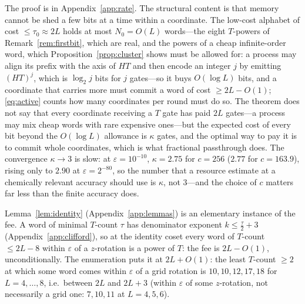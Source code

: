 \documentclass[aps,prx,twocolumn,superscriptaddress,nofootinbib,longbibliography]{revtex4-2}
\theoremstyle{plain}
\theoremstyle{definition}
\theoremstyle{remark}
\begin{document}
The proof is in Appendix~\ref{app:rate}. The structural content is that memory cannot be shed a few bits at a time within a coordinate. The low-cost alphabet of cost $\le\tau_0\approx2L$ holds at most $N_0=O(L)$ words---the eight $T$-powers of Remark~\ref{rem:firstbit}, which are real, and the powers of a cheap infinite-order word, which Proposition~\ref{prop:cluster} shows must be allowed for: a process may align its prefix with the axis of $HT$ and then encode an integer $j$ by emitting $(HT)^j$, which is $\log_2j$ bits for $j$ gates---so it buys $O(\log L)$ bits, and a coordinate that carries more must commit a word of cost $\ge2L-O(1)$; \eqref{eq:active} counts how many coordinates per round must do so. The theorem does not say that every coordinate receiving a $T$ gate has paid $2L$ gates---a process may mix cheap words with rare expensive ones---but the expected cost of every bit beyond the $O(\log L)$ allowance is $\kappa$ gates, and the optimal way to pay it is to commit whole coordinates, which is what fractional passthrough does. The convergence $\kappa\to3$ is slow: at $\varepsilon=10^{-10}$, $\kappa=2.75$ for $c=256$ ($2.77$ for $c=163.9$), rising only to $2.90$ at $\varepsilon=2^{-80}$, so the number that a resource estimate at a chemically relevant accuracy should use is $\kappa$, not $3$---and the choice of $c$ matters far less than the finite accuracy does.

Lemma~\ref{lem:identity} (Appendix~\ref{app:lemmas}) is an elementary instance of the fee. A word of minimal $T$-count $\tau$ has denominator exponent $k\le\tfrac\tau2+3$ (Appendix~\ref{app:clifford}), so at the identity coset every word of $T$-count $\le2L-8$ within $\varepsilon$ of a $z$-rotation is a power of $T$: the fee is $2L-O(1)$, unconditionally. The enumeration puts it at $2L+O(1)$: the least $T$-count $\ge2$ at which some word comes within $\varepsilon$ of a grid rotation is $10,10,12,17,18$ for $L=4,\dots,8$, i.e.\ between $2L$ and $2L+3$ (within $\varepsilon$ of some $z$-rotation, not necessarily a grid one: $7,10,11$ at $L=4,5,6$).
\end{document}
